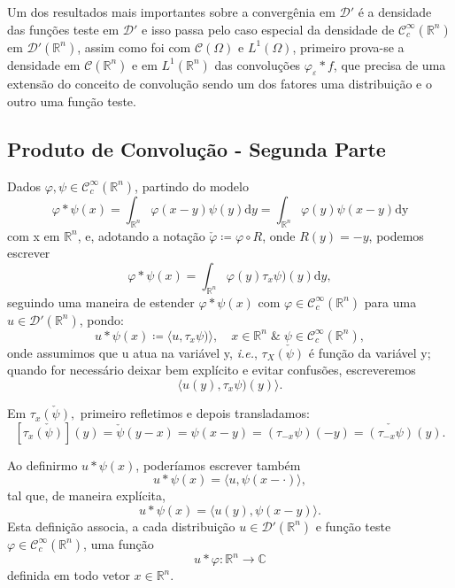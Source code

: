 \documentclass[../distribution_theory_notes.tex]{subfiles}
\begin{document}
Um dos resultados mais importantes sobre a convergênia em \(\mathcal{D}'\) é a densidade das funções teste em \(\mathcal{D}'\) e isso passa pelo caso especial da densidade de \(\mathcal{C}_{c}^{\infty}(\mathbb{R}^{n})\) em \(\mathcal{D}'(\mathbb{R}^{n})\),
assim como foi com \(\mathcal{C}(\Omega )\) e \(L^{1}(\Omega )\), primeiro prova-se a densidade em \(\mathcal{C}(\mathbb{R}^{n})\) e em \(L^{1}(\mathbb{R}^{n})\) das convoluções \(\varphi_{\varepsilon }*f\), que precisa de uma extensão do conceito de convolução
sendo um dos fatores uma distribuição e o outro uma função teste.

\subsection{Produto de Convolução - Segunda Parte}

Dados \(\varphi , \psi \in \mathcal{C}_{c}^{\infty}(\mathbb{R}^{n})\), partindo do modelo
\[
	\varphi *\psi (x) = \int_{\mathbb{R}^{n}}^{}\varphi(x-y)\psi (y) \mathrm{d}y = \int_{\mathbb{R}^{n}}^{}\varphi(y)\psi (x-y) \mathrm{dy}
\]
com x em \(\mathbb{R}^{n}\), e, adotando a notação \(\check{\varphi} \coloneqq \varphi \circ R\), onde \(R(y) = -y\), podemos escrever
\[
	\varphi * \psi (x) = \int_{\mathbb{R}^{n}}^{}\varphi (y)\tau_{x}{\psi} )(y) \mathrm{d}y,
\]
seguindo uma maneira de estender \(\varphi * \psi (x)\) com \(\varphi \in \mathcal{C}_{c}^{\infty}(\mathbb{R}^{n})\) para uma \(u\in \mathcal{D}'(\mathbb{R}^{n})\), pondo:
\[
	u*\psi (x)\coloneqq \langle u, \tau_{x}{\psi} ) \rangle,\quad x\in \mathbb{R}^{n}\;\&\; \psi \in \mathcal{C}_{c}^{\infty}(\mathbb{R}^{n}),
\]
onde assumimos que u atua na variável y, \textit{i.e.}, \(\tau_{X}\check{(\psi )}\) é função da variável y; quando for necessário deixar bem explícito e evitar confusões, escreveremos
\[
	\langle u(y), \tau_{x}{\psi} )(y) \rangle.
\]
\begin{tcolorbox}[
		skin=enhanced,
		title=Observação,
		fonttitle=\bfseries,
		colframe=black,
		colbacktitle=cyan!75!white,
		colback=cyan!15,
		colbacklower=black,
		coltitle=black,
		drop fuzzy shadow,
	]
	Em \(\tau_{x}\check{(\psi )},\) primeiro refletimos e depois transladamos:
	\[
		[\tau_{x}\check{(\psi )}](y) = \check{\psi}(y-x) = \psi(x-y) = (\tau_{-x}\psi )(-y) = \check{(\tau_{-x}\psi )}(y).
	\]
\end{tcolorbox}
Ao definirmo \(u*\psi (x)\), poderíamos escrever também
\[
	u * \psi (x) = \langle u, \psi (x - \cdot ) \rangle,
\]
tal que, de maneira explícita,
\[
	u*\psi (x) = \langle u(y), \psi (x-y) \rangle.
\]
Esta definição associa, a cada distribuição \(u\in \mathcal{D}'(\mathbb{R}^{n})\) e função teste \(\varphi \in \mathcal{C}_{c}^{\infty}(\mathbb{R}^{n})\), uma função
\[
	u*\varphi :\mathbb{R}^{n}\rightarrow \mathbb{C}
\]
definida em todo vetor \(x\in \mathbb{R}^{n}\).
\end{document}
